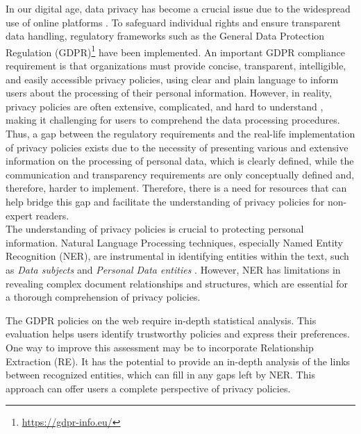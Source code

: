 \documentclass[a4paper,
               biblatex,     %
               hyphens,      %
               ]{jacow}
\begin{document}
In our digital age, data privacy has become a crucial issue due to the widespread use of online platforms \cite{6227909}. To safeguard individual rights and ensure transparent data handling, regulatory frameworks such as the General Data Protection Regulation (GDPR)\footnote{\url{https://gdpr-info.eu/}} have been implemented. An important GDPR compliance requirement is that organizations must provide concise, transparent, intelligible, and easily accessible privacy policies, using clear and plain language to inform users about the processing of their personal information. However, in reality, privacy policies are often extensive, complicated, and hard to understand \cite{9624976}, making it challenging for users to comprehend the data processing procedures. Thus, a gap between the regulatory requirements and the real-life implementation of privacy policies exists due to the necessity of presenting various and extensive information on the processing of personal data, which is clearly defined, while the communication and transparency requirements are only conceptually defined and, therefore, harder to implement. Therefore, there is a need for resources that can help bridge this gap and facilitate the understanding of privacy policies for non-expert readers.\\
The understanding of privacy policies is crucial to protecting personal information. Natural Language Processing techniques, especially Named Entity Recognition (NER), are instrumental in identifying entities within the text, such as \textit{Data subjects} and \textit{Personal Data entities} \cite{9582331}. However, NER has limitations in revealing complex document relationships and structures, which are essential for a thorough comprehension of privacy policies.

The GDPR policies on the web require in-depth statistical analysis. This evaluation helps users identify trustworthy policies and express their preferences. One way to improve this assessment may be to incorporate Relationship Extraction (RE). It has the potential to provide an in-depth analysis of the links between recognized entities, which can fill in any gaps left by NER. This approach can offer users a complete perspective of privacy policies.

\end{document}

